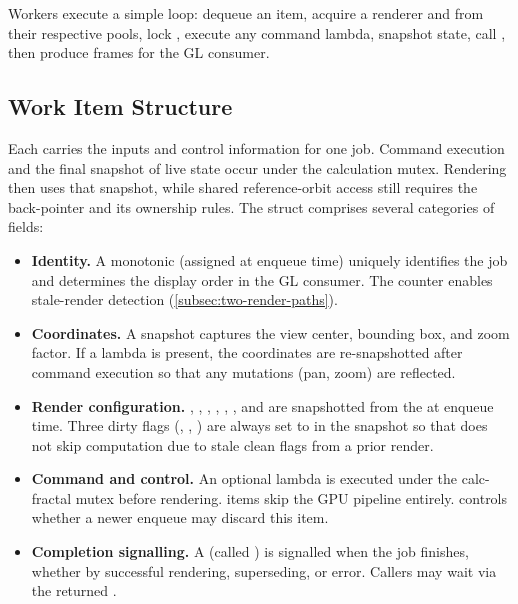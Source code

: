 Workers execute a simple loop: dequeue an item, acquire a renderer and
 from their respective pools, lock
, execute any command lambda, snapshot state, call
, then produce frames for the GL consumer.

\subsection{Work Item Structure}%
\label{subsec:work-item-struct}

Each  carries the inputs and control information for one job.
Command execution and the final snapshot of live state occur under the calculation
mutex. Rendering then uses that snapshot, while shared reference-orbit access still
requires the  back-pointer and its ownership rules. The struct
comprises several categories of fields:

\begin{itemize}
  \item \textbf{Identity.}  A monotonic 
        (assigned at enqueue time) uniquely identifies the job and
        determines the display order in the GL consumer.  The
         counter enables stale-render
        detection (\cref{subsec:two-render-paths}).
  \item \textbf{Coordinates.}  A 
        snapshot captures the view center, bounding box, and zoom
        factor.  If a  lambda is present, the
        coordinates are re-snapshotted after command execution so that
        any mutations (pan, zoom) are reflected.
  \item \textbf{Render configuration.}  ,
        , ,
        , ,
        , and  are
        snapshotted from the  at enqueue time.
        Three dirty flags (,
        , ) are
        always set to  in the snapshot so that
         does not skip computation due to
        stale clean flags from a prior render.
  \item \textbf{Command and control.}  An optional
         lambda is executed under the calc-fractal
        mutex before rendering.   items skip the
        GPU pipeline entirely.   controls whether
        a newer enqueue may discard this item.
  \item \textbf{Completion signalling.}  A
        (called ) is signalled when the job
        finishes, whether by successful rendering, superseding, or
        error.  Callers may wait via the returned
        .
\end{itemize}

